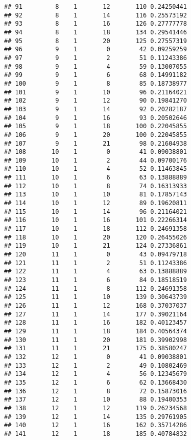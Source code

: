 \documentclass[
]{article}
\begin{document}
\begin{verbatim}
## 91         8    1       12       110 0.24250441
## 92         8    1       14       116 0.25573192
## 93         8    1       16       126 0.27777778
## 94         8    1       18       134 0.29541446
## 95         8    1       20       125 0.27557319
## 96         9    1        0        42 0.09259259
## 97         9    1        2        51 0.11243386
## 98         9    1        4        59 0.13007055
## 99         9    1        6        68 0.14991182
## 100        9    1        8        85 0.18738977
## 101        9    1       10        96 0.21164021
## 102        9    1       12        90 0.19841270
## 103        9    1       14        92 0.20282187
## 104        9    1       16        93 0.20502646
## 105        9    1       18       100 0.22045855
## 106        9    1       20       100 0.22045855
## 107        9    1       21        98 0.21604938
## 108       10    1        0        41 0.09038801
## 109       10    1        2        44 0.09700176
## 110       10    1        4        52 0.11463845
## 111       10    1        6        63 0.13888889
## 112       10    1        8        74 0.16313933
## 113       10    1       10        81 0.17857143
## 114       10    1       12        89 0.19620811
## 115       10    1       14        96 0.21164021
## 116       10    1       16       101 0.22266314
## 117       10    1       18       112 0.24691358
## 118       10    1       20       120 0.26455026
## 119       10    1       21       124 0.27336861
## 120       11    1        0        43 0.09479718
## 121       11    1        2        51 0.11243386
## 122       11    1        4        63 0.13888889
## 123       11    1        6        84 0.18518519
## 124       11    1        8       112 0.24691358
## 125       11    1       10       139 0.30643739
## 126       11    1       12       168 0.37037037
## 127       11    1       14       177 0.39021164
## 128       11    1       16       182 0.40123457
## 129       11    1       18       184 0.40564374
## 130       11    1       20       181 0.39902998
## 131       11    1       21       175 0.38580247
## 132       12    1        0        41 0.09038801
## 133       12    1        2        49 0.10802469
## 134       12    1        4        56 0.12345679
## 135       12    1        6        62 0.13668430
## 136       12    1        8        72 0.15873016
## 137       12    1       10        88 0.19400353
## 138       12    1       12       119 0.26234568
## 139       12    1       14       135 0.29761905
## 140       12    1       16       162 0.35714286
## 141       12    1       18       185 0.40784832

\end{verbatim}
\end{document}
